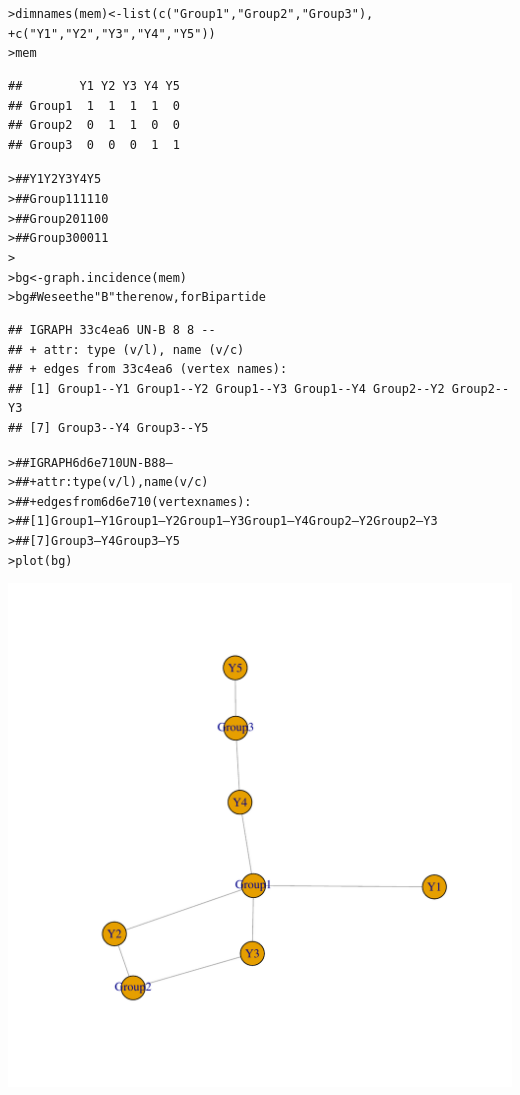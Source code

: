 \documentclass[12pt]{article}\usepackage[]{graphicx}\usepackage[]{color}
\makeatletter
\newcommand{\hlstr}[1]{\textcolor[rgb]{0.82,0.78,0.62}{#1}}%
\newcommand{\hlcom}[1]{\textcolor[rgb]{0.404,0.408,0.42}{#1}}%
\newcommand{\hlstd}[1]{\textcolor[rgb]{0.882,0.878,0.898}{#1}}%
\newcommand{\hlkwb}[1]{\textcolor[rgb]{0.902,0.675,0.196}{#1}}%
\newcommand{\hlkwd}[1]{\textcolor[rgb]{0.733,0.388,0.812}{#1}}%
\newenvironment{kframe}{%
 \def\at@end@of@kframe{}%
 \ifinner\ifhmode%
  \def\at@end@of@kframe{\end{minipage}}%
  \begin{minipage}{\columnwidth}%
 \fi\fi%
 \def\FrameCommand##1{\hskip\@totalleftmargin \hskip-\fboxsep
 \colorbox{shadecolor}{##1}\hskip-\fboxsep
     \hskip-\linewidth \hskip-\@totalleftmargin \hskip\columnwidth}%
 \MakeFramed {\advance\hsize-\width
   \@totalleftmargin\z@ \linewidth\hsize
   \@setminipage}}%
 {\par\unskip\endMakeFramed%
 \at@end@of@kframe}
\newenvironment{knitrout}{}{} %
\makeatother
\begin{document}
\begin{flushleft}
\begin{center}
\begin{knitrout}
\begin{kframe}
\begin{alltt}
\hlstd{> }\hlkwd{dimnames}\hlstd{(mem)} \hlkwb{<-} \hlkwd{list}\hlstd{(}\hlkwd{c}\hlstd{(}\hlstr{"Group1"}\hlstd{,}\hlstr{"Group2"}\hlstd{,}\hlstr{"Group3"}\hlstd{),}
\hlstd{+ }                      \hlkwd{c}\hlstd{(}\hlstr{"Y1"}\hlstd{,}\hlstr{"Y2"}\hlstd{,}\hlstr{"Y3"}\hlstd{,}\hlstr{"Y4"}\hlstd{,}\hlstr{"Y5"}\hlstd{))}
\hlstd{> }\hlstd{mem}
\end{alltt}
\begin{verbatim}
##        Y1 Y2 Y3 Y4 Y5
## Group1  1  1  1  1  0
## Group2  0  1  1  0  0
## Group3  0  0  0  1  1
\end{verbatim}
\begin{alltt}
\hlstd{> }\hlcom{##        Y1 Y2 Y3 Y4 Y5}
\hlstd{> }\hlcom{## Group1  1  1  1  1  0}
\hlstd{> }\hlcom{## Group2  0  1  1  0  0}
\hlstd{> }\hlcom{## Group3  0  0  0  1  1}
\hlstd{> }
\hlstd{> }\hlstd{bg} \hlkwb{<-} \hlkwd{graph.incidence}\hlstd{(mem)}
\hlstd{> }\hlstd{bg}  \hlcom{# We see the "B" there now, for Bipartide}
\end{alltt}
\begin{verbatim}
## IGRAPH 33c4ea6 UN-B 8 8 -- 
## + attr: type (v/l), name (v/c)
## + edges from 33c4ea6 (vertex names):
## [1] Group1--Y1 Group1--Y2 Group1--Y3 Group1--Y4 Group2--Y2 Group2--Y3
## [7] Group3--Y4 Group3--Y5
\end{verbatim}
\begin{alltt}
\hlstd{> }\hlcom{## IGRAPH 6d6e710 UN-B 8 8 --}
\hlstd{> }\hlcom{## + attr: type (v/l), name (v/c)}
\hlstd{> }\hlcom{## + edges from 6d6e710 (vertex names):}
\hlstd{> }\hlcom{## [1] Group1--Y1 Group1--Y2 Group1--Y3 Group1--Y4 Group2--Y2 Group2--Y3}
\hlstd{> }\hlcom{## [7] Group3--Y4 Group3--Y5}
\hlstd{> }\hlkwd{plot}\hlstd{(bg)}
\end{alltt}
\end{kframe}
\includegraphics[width=6in]{figure/Network_Basics-5} 

\end{knitrout}
\end{center}
\end{flushleft}
\end{document}
